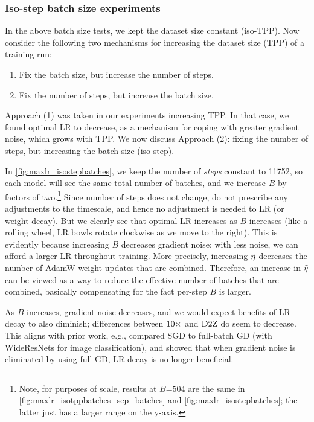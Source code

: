 \subsubsection{Iso-step batch size experiments} 




In the above batch size tests, we kept the dataset size constant
(iso-TPP).  Now consider the following two mechanisms for increasing
the dataset size (TPP) of a training run:
\begin{enumerate}
\item Fix the batch size, but increase the number of steps.
\item Fix the number of steps, but increase the batch size.
\end{enumerate}
Approach (1) was taken in our experiments increasing TPP\@.  In that
case, we found optimal LR to decrease, as a mechanism for coping with
greater gradient noise, which grows with TPP\@.
%
We now discuss Approach (2): fixing the number of steps, but
increasing the batch size (iso-step).

In \cref{fig:maxlr_isostepbatches}, we keep the number of \emph{steps}
constant to 11752, so each model will see the same total number of
batches, and we increase $B$ by factors of two.\footnote{Note, for
purposes of scale, results at $B$=$504$ are the same in
\cref{fig:maxlr_isotppbatches_sep_batches} and
\cref{fig:maxlr_isostepbatches}; the latter just has a larger range on
the y-axis.}
%
Since number of steps does not change, \citet{wang2024how} do not
prescribe any adjustments to the timescale, and hence no adjustment is
needed to LR (or weight decay).
%
But we clearly see that optimal LR increases as $B$ increases
(like a rolling wheel, LR bowls rotate clockwise as we move to the
right).
%
This is evidently because increasing $B$ decreases gradient noise;
with less noise, we can afford a larger LR throughout training.
%
More precisely, increasing $\tilde{\eta}$ decreases the number of AdamW
weight updates that are combined.  Therefore, an increase in $\tilde{\eta}$
can be viewed as a way to reduce the effective number of batches that
are combined, basically compensating for the fact per-step $B$ is
larger.

As $B$ increases, gradient noise decreases, and we would expect
benefits of LR decay to also diminish; differences between $\mbox{10}\times$ and
$\mbox{D2Z}$ do seem to decrease.
%
This aligns with prior work, e.g., \citet{you2019how} compared SGD to
full-batch GD (with WideResNets for image classification), and showed
that when gradient noise is eliminated by using full GD, LR decay is
no longer beneficial.

